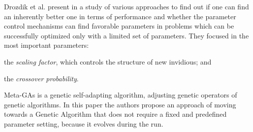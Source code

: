 Drozdik et al. present in \cite{Drozdik} a study of various approaches to find out if one can find an inherently better one in terms of performance and whether the parameter control mechanisms can find favorable parameters in problems which can be successfully optimized only with a limited set of parameters. They focused in the most important parameters: 
\begin{inparaenum}[1)]
\item the \textit{scaling factor}, which controls the structure of new invidious; and
\item the \textit{crossover probability}.
\end{inparaenum}

{\sc Meta-GAs} \cite{Clune2005} is a genetic self-adapting algorithm, adjusting genetic operators of genetic algorithms. In this paper the authors propose an approach of moving towards a Genetic Algorithm that does not require a fixed and predefined parameter setting, because it evolves during the run.

